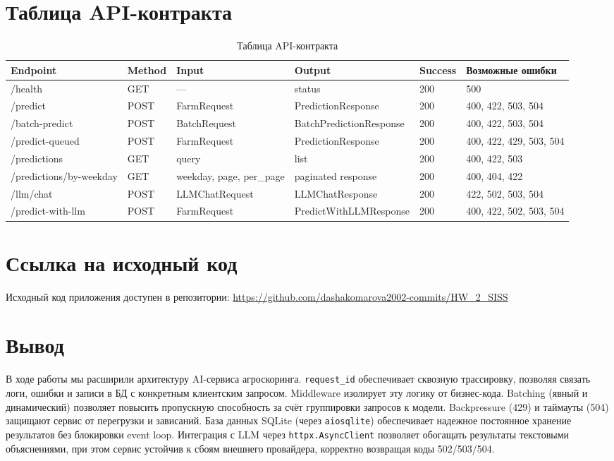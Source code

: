 \documentclass[12pt,a4paper]{article}
\begin{document}
\section{Таблица API-контракта}

\begin{table}[H]
\centering
\caption{Таблица API-контракта}
\label{tab:api_contract}
\begin{tabular}{|p{3.2cm}|p{1.4cm}|p{2.4cm}|p{3cm}|p{1.2cm}|p{2.4cm}|}
\hline
\textbf{Endpoint} & \textbf{Method} & \textbf{Input} & \textbf{Output} & \textbf{Success} & \textbf{Возможные ошибки} \\
\hline
/health & GET & --- & status & 200 & 500 \\
/predict & POST & FarmRequest & PredictionResponse & 200 & 400, 422, 503, 504 \\
/batch-predict & POST & BatchRequest & BatchPredictionResponse & 200 & 400, 422, 503, 504 \\
/predict-queued & POST & FarmRequest & PredictionResponse & 200 & 400, 422, 429, 503, 504 \\
/predictions & GET & query & list & 200 & 400, 422, 503 \\
/predictions/by-weekday & GET & weekday, page, per\_page & paginated response & 200 & 400, 404, 422 \\
/llm/chat & POST & LLMChatRequest & LLMChatResponse & 200 & 422, 502, 503, 504 \\
/predict-with-llm & POST & FarmRequest & PredictWithLLMResponse & 200 & 400, 422, 502, 503, 504 \\
\hline
\end{tabular}
\end{table}

\section{Ссылка на исходный код}

Исходный код приложения доступен в репозитории: \url{https://github.com/dashakomarova2002-commits/HW_2_SISS}

\section{Вывод}

В ходе работы мы расширили архитектуру AI-сервиса агроскоринга. \texttt{request\_id} обеспечивает сквозную трассировку, позволяя связать логи, ошибки и записи в БД с конкретным клиентским запросом. Middleware изолирует эту логику от бизнес-кода. Batching (явный и динамический) позволяет повысить пропускную способность за счёт группировки запросов к модели. Backpressure (429) и таймауты (504) защищают сервис от перегрузки и зависаний. База данных SQLite (через \texttt{aiosqlite}) обеспечивает надежное постоянное хранение результатов без блокировки event loop. Интеграция с LLM через \texttt{httpx.AsyncClient} позволяет обогащать результаты текстовыми объяснениями, при этом сервис устойчив к сбоям внешнего провайдера, корректно возвращая коды 502/503/504.
\end{document}
